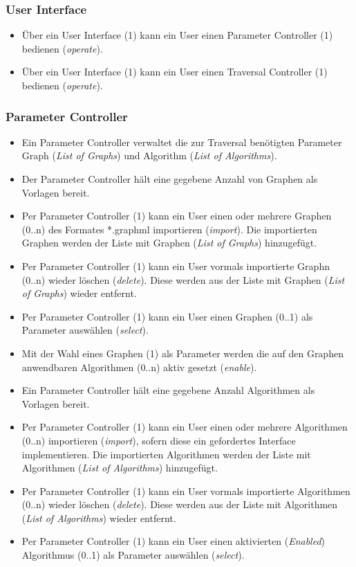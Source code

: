 \subsubsection{User Interface}
\label{subsubsec:User Interface}
\begin{itemize}
  \item \"Uber ein User Interface (1) kann ein User einen Parameter Controller (1) bedienen (\textit{operate}).
  \item \"Uber ein User Interface (1) kann ein User einen Traversal Controller (1) bedienen (\textit{operate}).
\end{itemize}
% 
\subsubsection{Parameter Controller}
\label{subsubsec:Parameter Controller}
\begin{itemize}
  \item Ein Parameter Controller verwaltet die zur Traversal ben\"otigten Parameter Graph (\textit{List of Graphs}) und Algorithm (\textit{List of Algorithms}).
  \item Der Parameter Controller h\"alt eine gegebene Anzahl von Graphen als Vorlagen bereit.
  \item Per Parameter Controller (1) kann ein User einen oder mehrere Graphen (0..n) des Formates *.graphml importieren (\textit{import}). Die importierten Graphen werden der Liste mit Graphen (\textit{List of Graphs}) hinzugef\"ugt.
  \item Per Parameter Controller (1) kann ein User vormals importierte Graphn (0..n) wieder l\"oschen (\textit{delete}). Diese werden aus der Liste mit Graphen (\textit{List of Graphs}) wieder entfernt.
  \item Per Parameter Controller (1) kann ein User einen Graphen (0..1) als Parameter ausw\"ahlen (\textit{select}).
  \item Mit der Wahl eines Graphen (1) als Parameter werden die auf den Graphen anwendbaren Algorithmen (0..n) aktiv gesetzt (\textit{enable}).
  \item Ein Parameter Controller h\"alt eine gegebene Anzahl Algorithmen als Vorlagen bereit.
  \item Per Parameter Controller (1) kann ein User einen oder mehrere Algorithmen (0..n) importieren (\textit{import}), sofern diese ein gefordertes Interface implementieren. Die importierten Algorithmen werden der Liste mit Algorithmen (\textit{List of Algorithms}) hinzugef\"ugt.
  \item Per Parameter Controller (1) kann ein User vormals importierte Algorithmen (0..n) wieder l\"oschen (\textit{delete}). Diese werden aus der Liste mit Algorithmen (\textit{List of Algorithms}) wieder entfernt.
  \item Per Parameter Controller (1) kann ein User einen aktivierten (\textit{Enabled}) Algorithmus (0..1) als Parameter ausw\"ahlen (\textit{select}).
\end{itemize}
% 
